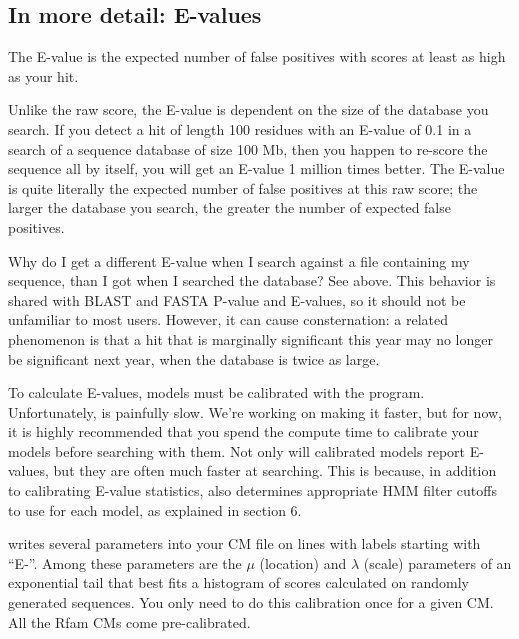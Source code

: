 \subsection{In more detail:  E-values}

The E-value is the expected number of false positives with scores at
least as high as your hit.

Unlike the raw score, the E-value is dependent on the size of the
database you search. If you detect a hit of length 100 residues 
with an E-value of 0.1 in a search of a sequence database of size 100
Mb, then you happen to re-score the sequence all by itself, you will
get an E-value 1 million times better. The E-value is quite literally
the expected number of false positives at this raw score; the larger
the database you search, the greater the number of expected false
positives.

\begin{srefaq}{Why do I get a different E-value when I search
against a file containing my sequence, than I got when I searched the
database?} See above. This behavior is shared with BLAST and FASTA
  P-value and E-values, so it should not be unfamiliar to most users.
  However, it can cause consternation: a related phenomenon is that a
hit that is marginally significant this year may no longer be
significant next year, when the database is twice as large. 
\end{srefaq}

To calculate E-values, models must be calibrated with the
 program. Unfortunately,  is
painfully slow. We're working on making it faster, but for now, it is
highly recommended that you spend the compute time to calibrate your
models before searching with them. Not only will calibrated models
report E-values, but they are often much faster at searching. This is
because, in addition to calibrating E-value statistics, 
also determines appropriate HMM filter cutoffs to use for each model, as
explained in section 6.

 writes several parameters into your CM file on
lines with labels starting with ``E-''. Among these parameters are the
$\mu$ (location) and $\lambda$ (scale) parameters of an exponential
tail that best fits a histogram of scores calculated on randomly
generated sequences. You only need to do this calibration once
for a given CM. All the Rfam CMs come pre-calibrated.

